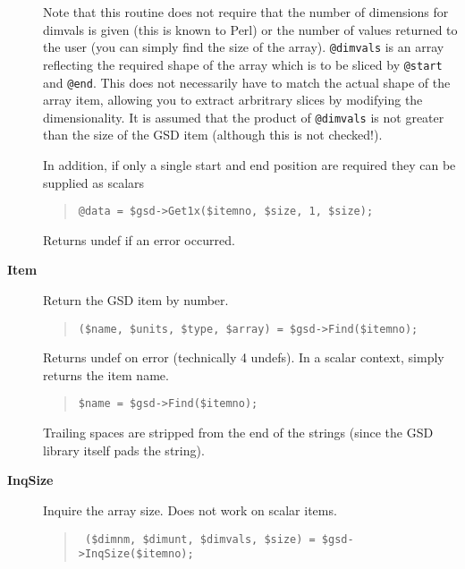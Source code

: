 \documentclass[twoside,11pt]{article}
\newenvironment{myquote}{\begin{quote}\begin{small}}{\end{small}\end{quote}}
\newcommand{\perl}{\xref{\textsf{Perl}}{sun193}{}}
\newcommand{\xref}[3]{#1}
\renewcommand{\_}{\texttt{\symbol{95}}}
\begin{document}
\begin{description}
Note that this routine does not require that the number of dimensions for
dimvals is given (this is known to \perl) or the number of values returned to
the user (you can simply find the size of the array).  \texttt{@dimvals} is an
array reflecting the required shape of the array which is to be sliced by
\texttt{@start} and \texttt{@end}. This does not necessarily have to match the
actual shape of the array item, allowing you to extract arbritrary slices by
modifying the dimensionality. It is assumed that the product of
\texttt{@dimvals} is not greater than the size of the GSD item (although this
is not checked!).



In addition, if only a single start and end position are required
they can be supplied as scalars

\begin{myquote}
\begin{verbatim}
@data = $gsd->Get1x($itemno, $size, 1, $size);
\end{verbatim} 
\end{myquote} 

Returns undef if an error occurred.

\item[\textbf{Item}] \mbox{}

Return the GSD item by number.

\begin{myquote}
\begin{verbatim}
($name, $units, $type, $array) = $gsd->Find($itemno);
\end{verbatim}
\end{myquote}

Returns undef on error (technically 4 undefs).
In a scalar context, simply returns the item name.

\begin{myquote}
\begin{verbatim}
$name = $gsd->Find($itemno);
\end{verbatim}
\end{myquote} %

Trailing spaces are stripped from the end of the strings (since the
GSD library itself pads the string).

\item[\textbf{InqSize}] \mbox{}

Inquire the array size. Does not work on scalar items.

\begin{myquote}
\begin{verbatim}
 ($dimnm, $dimunt, $dimvals, $size) = $gsd->InqSize($itemno);
\end{verbatim}
\end{myquote}


\end{description}
\end{document}

